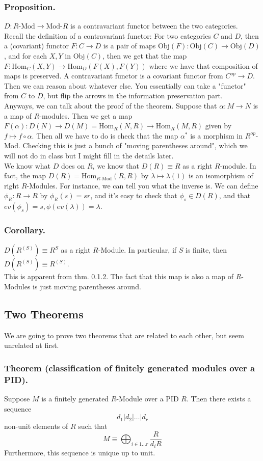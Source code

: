 \documentclass{article}
\newcommand{\vs}{\bigskip\\\text{}}
\begin{document}
\subsubsection{Proposition.} $D: \text{$R$-Mod} \to \text{Mod-$R$}$ is a
contravariant functor between the two categories.\vs
Recall the definition of a contravariant functor: For two categories $C$ and
$D$, then a (covariant) functor $F: C\to D$ is a pair of maps $\text{Obj}(F):
\text{Obj}(C)\to \text{Obj}(D)$, and for each $X,Y$ in $\text{Obj}(C)$, then
we get that the map $F: \text{Hom}_C(X,Y) \to \text{Hom}_D(F(X), F(Y))$
where we have that composition of maps is preserved. A contravariant functor is
a covariant functor from $C^{op}\to D$. Then we can reason about whatever else.
You essentially can take a "functor" from $C$ to $D$, but flip the arrows in the
information preservation part.\vs
Anyways, we can talk about the proof of the theorem. Suppose that $\alpha: M \to
N$ is a map of $R$-modules. Then we get a map $F(\alpha): D(N) \to D(M) =
\text{Hom}_R(N,R) \to \text{Hom}_R(M,R)$ given by $f \mapsto f\circ \alpha$.
Then all we have to do is check that the map $\alpha^*$ is a morphism in
$R^{op}$-Mod. Checking this is just a bunch of "moving parentheses around",
which we will not do in class but I might fill in the details later.\vs
%
We know what $D$ does on $R$, we know that $D(R) \equiv R$ as a right
$R$-module. In fact, the map $D(R) = \text{Hom}_{\text{$R$-Mod}}(R,R)$ by
$\lambda \mapsto \lambda(1)$ is an isomorphism of right $R$-Modules. For
instance, we can tell you what the inverse is. We can define $\phi_R: R\to R$ by
$\phi_R(s) = sr$, and it's easy to check that $\phi_s \in D(R)$, and that
$ev(\phi_s) = s, \phi(ev(\lambda)) = \lambda$.
\subsubsection{Corollary.} $D(R^{(S)}) \equiv R^S$ as a right $R$-Module. In
particular, if $S$ is finite, then $D(R^{(S)}) \equiv R^{(S)}$.\vs
This is apparent from thm. 0.1.2. The fact that this map is also a map of
$R$-Modules is just moving parentheses around.
\subsection{Two Theorems}
We are going to prove two theorems that are related to each other, but seem
unrelated at first.
\subsubsection{Theorem (classification of finitely generated modules over a
PID).} Suppose $M$ is a finitely generated $R$-Module over a PID $R$. Then there
exists a sequence 
\[ d_1 | d_2 | \hdots | d_r\]
non-unit elements of $R$ such that
\[ M \equiv \bigoplus_{i \in 1\hdots r} \frac{R}{d_iR}\]
Furthermore, this sequence is unique up to unit.
\end{document}
